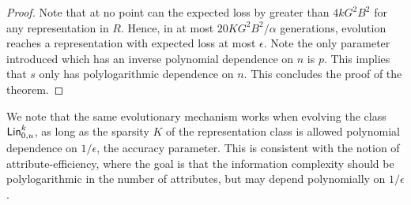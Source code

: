 \begin{proof}
Note that at no point can the expected loss by greater than $4kG^2B^2$ for any
representation in $R$. Hence, in at most $20 KG^2B^2/\alpha$ generations,
evolution reaches a representation with expected loss at most $\epsilon$. Note
the only parameter introduced which has an inverse polynomial dependence on $n$
is $p$. This implies that $s$ only has polylogarithmic dependence on $n$. This
concludes the proof of the theorem.
\end{proof}

\begin{remark} We note that the same evolutionary mechanism works when evolving
the class $\mathsf{Lin}^k_{0, u}$, as long as the sparsity $K$ of the representation
class is allowed polynomial dependence on $1/\epsilon$, the accuracy parameter.
This is consistent with the notion of attribute-efficiency, where the goal is
that the information complexity should be polylogarithmic in the number of
attributes, but may depend polynomially on $1/\epsilon$.
\end{remark}
